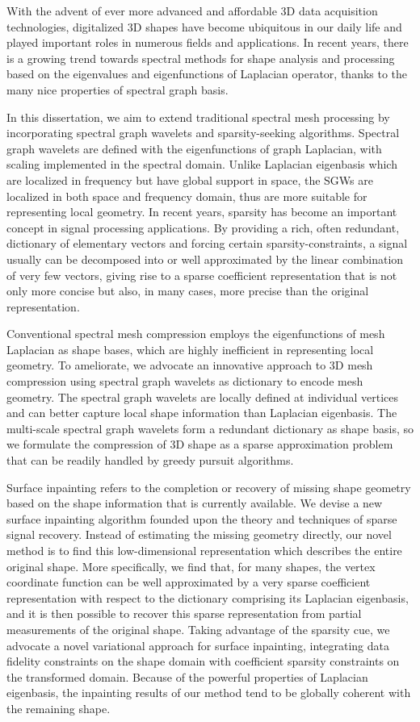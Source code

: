 \documentclass[12pt,letterpaper,twosided]{report}
\numberwithin{equation}{section}
\begin{document}
With the advent of ever more advanced and affordable 3D data acquisition
technologies, digitalized 3D shapes have become ubiquitous in our daily life
and played important roles in numerous fields and applications. In recent
years, there is a growing trend towards spectral methods for shape analysis
and processing based on the eigenvalues and eigenfunctions of Laplacian operator,
thanks to the many nice properties of spectral graph basis. 

In this dissertation, we aim to extend traditional spectral mesh processing
by incorporating spectral graph wavelets and sparsity-seeking
algorithms. Spectral graph wavelets are defined with the eigenfunctions of
graph Laplacian, with scaling implemented in the spectral domain. Unlike
Laplacian eigenbasis which are localized in frequency but have global support
in space, the SGWs are localized in both space and frequency domain, thus are
more suitable for representing local geometry. In recent years, sparsity has
become an important concept in signal processing applications. By providing a
rich, often redundant, dictionary of elementary vectors and forcing certain
sparsity-constraints, a signal usually can be decomposed into or well
approximated by the linear combination of very few vectors, giving rise to a
sparse coefficient representation that is not only more concise but also, in
many cases, more precise than the original representation.

Conventional spectral mesh compression employs the eigenfunctions of mesh
Laplacian as shape bases, which are highly inefficient in representing local
geometry. To ameliorate, we advocate an innovative approach to 3D mesh
compression using spectral graph wavelets as dictionary to encode mesh geometry.
The spectral graph wavelets are locally defined at individual vertices and can
better capture local shape information than Laplacian eigenbasis. The
multi-scale spectral graph wavelets form a redundant dictionary as shape basis,
so we formulate the compression of 3D shape as a sparse approximation problem
that can be readily handled by greedy pursuit algorithms.

Surface inpainting refers to the completion or recovery of missing shape
geometry based on the shape information that is currently available. We
devise a new surface inpainting algorithm founded upon the theory and
techniques of sparse signal recovery. Instead of estimating the missing
geometry directly, our novel method is to find this low-dimensional
representation which describes the entire original shape. More specifically,
we find that, for many shapes, the vertex coordinate function can be well
approximated by a very sparse coefficient representation with respect to the
dictionary comprising its Laplacian eigenbasis, and it is then possible to
recover this sparse representation from partial measurements of the original
shape. Taking advantage of the sparsity cue, we advocate a novel variational
approach for surface inpainting, integrating data fidelity constraints on the
shape domain with coefficient sparsity constraints on the transformed domain.
Because of the powerful properties of Laplacian eigenbasis, the inpainting
results of our method tend to be globally coherent with the remaining shape.
\end{document}
